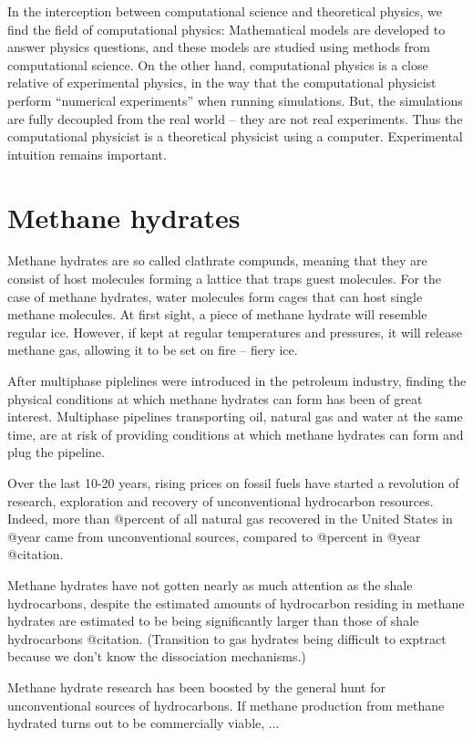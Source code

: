 In the interception between computational science and theoretical physics, we find the field of computational physics: Mathematical models are developed to answer physics questions, and these models are studied using methods from computational science. On the other hand, computational physics is a close relative of experimental physics, in the way that the computational physicist perform ``numerical experiments'' when running simulations. But, the simulations are fully decoupled from the real world -- they are not real experiments. Thus the computational physicist is a theoretical physicist using a computer. Experimental intuition remains important.

\section{Methane hydrates}
Methane hydrates are so called clathrate compunds, meaning that they are consist of host molecules forming a lattice that traps guest molecules. For the case of methane hydrates, water molecules form cages that can host single methane molecules. At first sight, a piece of methane hydrate will resemble regular ice. However, if kept at regular temperatures and pressures, it will release methane gas, allowing it to be set on fire -- fiery ice. 

After multiphase piplelines were introduced in the petroleum industry, finding the physical conditions at which methane hydrates can form has been of great interest. Multiphase pipelines transporting oil, natural gas and water at the same time, are at risk of providing conditions at which methane hydrates can form and plug the pipeline. 

Over the last 10-20 years, rising prices on fossil fuels have started a revolution of research, exploration and recovery of unconventional hydrocarbon resources. Indeed, more than @percent of all natural gas recovered in the United States in @year came from unconventional sources, compared to @percent in @year @citation. 

Methane hydrates have not gotten nearly as much attention as the shale hydrocarbons, despite the estimated amounts of hydrocarbon residing in methane hydrates are estimated to be being significantly larger than those of shale hydrocarbons @citation. 
(Transition to gas hydrates being difficult to exptract because we don't know the dissociation mechanisms.)

Methane hydrate research has been boosted by the general hunt for unconventional sources of hydrocarbons. If methane production from methane hydrated turns out to be commercially viable, ...

